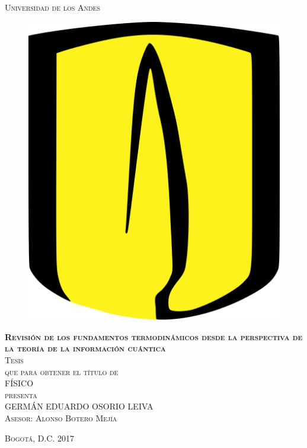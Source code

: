 \documentclass[11pt]{book}
\theoremstyle{definition}
\begin{document}
\begin{titlepage}
\begin{center}

\textsc{\Large Universidad de los Andes}\\[4em]

\begin{figure}[h]
\begin{center}
\includegraphics[scale=0.045]{ellogo.png}
\end{center}
\end{figure}

\vspace{4em}

\textsc{\huge \textbf{Revisión de los fundamentos termodinámicos desde la perspectiva de la teoría de la información cuántica}}\\[4em]

\textsc{\large Tesis}\\[1em]

\textsc{que para obtener el título de}\\[1em]

\textsc{FÍSICO}\\[1em]

\textsc{presenta}\\[1em]

\textsc{\Large 	GERMÁN EDUARDO OSORIO LEIVA}\\[1em]

\textsc{\large Asesor: Alonso Botero Mejía}

\end{center}

\vspace*{\fill}
\textsc{Bogotá, D.C. \hspace*{\fill} 2017}

\end{titlepage}
\end{document}
